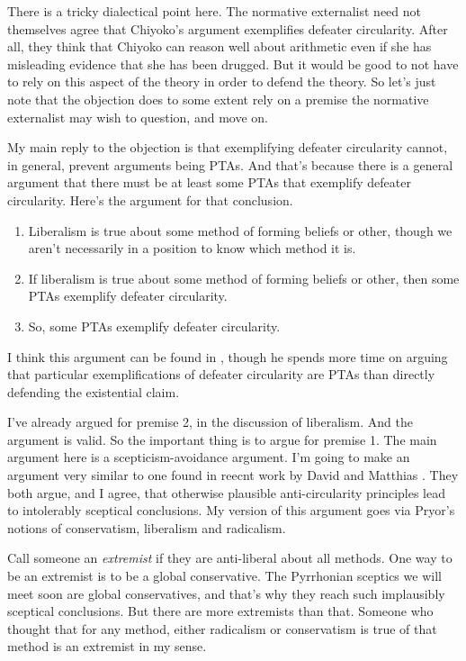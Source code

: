 There is a tricky dialectical point here. The normative externalist need not themselves agree that \gls{Chiyoko}'s argument exemplifies defeater circularity. After all, they think that \gls{Chiyoko} can reason well about arithmetic even if she has misleading evidence that she has been drugged. But it would be good to not have to rely on this aspect of the theory in order to defend the theory. So let's just note that the objection does to some extent rely on a premise the normative externalist may wish to question, and move on.

My main reply to the objection is that exemplifying defeater circularity cannot, in general, prevent arguments being PTAs. And that's because there is a general argument that there must be at least some PTAs that exemplify defeater circularity. Here's the argument for that conclusion.

\begin{enumerate}
\item{} Liberalism is true about some method of forming beliefs or other, though we aren't necessarily in a position to know which method it is.

\item{} If liberalism is true about some method of forming beliefs or other, then some PTAs exemplify defeater circularity.

\item{} So, some PTAs exemplify defeater circularity.

\end{enumerate}
I think this argument can be found in \citet{Pryor2004}, though he spends more time on arguing that particular exemplifications of defeater circularity are PTAs than directly defending the existential claim.

I've already argued for premise 2, in the discussion of liberalism. And the argument is valid. So the important thing is to argue for premise 1. The main argument here is a scepticism-avoidance argument. I'm going to make an argument very similar to one found in reecnt work by David \citet{Alexander2011} and Matthias \citet{Steup2013}. They both argue, and I agree, that otherwise plausible anti-circularity principles lead to intolerably sceptical conclusions. My version of this argument goes via Pryor's notions of conservatism, liberalism and radicalism.

Call someone an \emph{extremist} if they are anti-liberal about all methods. One way to be an extremist is to be a global conservative. The Pyrrhonian sceptics we will meet soon are global conservatives, and that's why they reach such implausibly sceptical conclusions. But there are more extremists than that. Someone who thought that for any method, either radicalism or conservatism is true of that method is an extremist in my sense.

